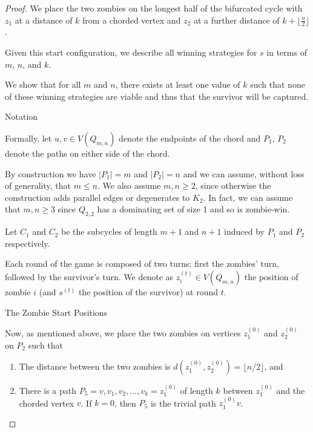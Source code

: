 \documentclass[letterpaper, 10pt]{article}
\begin{document}
\begin{proof}
We place the two zombies on the longest half of the bifurcated cycle with $z_1$ at a distance of $k$
from a chorded vertex and $z_2$ at a further distance of $k + \lfloor \frac{n}{2}\rfloor$.

Given this start configuration, we describe all winning strategies for $s$ in terms of
$m$, $n$, and $k$.

We show that for all $m$ and $n$, there exists at least one value of $k$ such that
none of these winning strategies are viable and thus that the survivor will be captured.

\begin{proofpart} Notation

Formally, let $u,v \in V(Q_{m,n})$ denote the endpoints of the
chord and $P_1$, $P_2$ denote the paths on either side of the chord.

By construction we have $\lvert P_1 \rvert = m$ and $\lvert P_2 \rvert = n$ and we
can assume, without loss of generality, that $m \leq n$. We also assume $m,n \geq 2$, since
otherwise the construction adds parallel edges or degenerates to $K_2$.
In fact, we can assume that $m, n \geq 3$ since $Q_{2,2}$ has a dominating set of size 1 and
so is zombie-win.

Let $C_1$ and $C_2$ be the subcycles of length $m+1$ and $n+1$ induced by
$P_1$ and $P_2$ respectively.

Each round of the game is composed of two turns: first the zombies' turn, followed by the
survivor's turn. We denote as $z_i^{(t)} \in V(Q_{m,n})$ the position of zombie $i$
(and $s^{(t)}$ the position of the survivor) at round $t$.

\end{proofpart}

\begin{proofpart} The Zombie Start Positions

Now, as mentioned above, we place the two zombies on vertices $z_1^{(0)}$ and $z_2^{(0)}$ on $P_2$ such that

\begin{enumerate}
\item The distance between the two zombies is $d(z_1^{(0)}, z_2^{(0)}) = \lfloor n/2 \rfloor$,  and
\item There is a path $P_5 = v, v_1, v_2, \dots, v_k = z_1^{(0)}$ of length $k$ between $z_1^{(0)}$ and
    the chorded vertex $v$.
    If $k=0$, then $P_5$ is the trivial path $z_1^{(0)}v$.
\end{enumerate}


\end{proofpart}
\end{proof}
\end{document}
